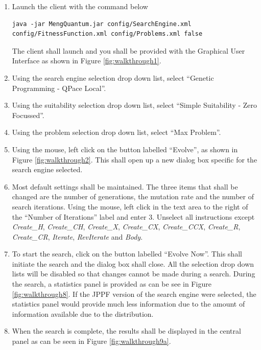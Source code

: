\begin{enumerate}
 \item Launch the client with the command below
\begin{lstlisting}
java -jar MengQuantum.jar config/SearchEngine.xml config/FitnessFunction.xml config/Problems.xml false
\end{lstlisting}
The client shall launch and you shall be provided with the Graphical User Interface as shown in Figure \ref{fig:walkthrough1}.

\item Using the search engine selection drop down list, select ``Genetic Programming - QPace Local''.

\item Using the suitability selection drop down list, select ``Simple Suitability - Zero Focussed''.

\item Using the problem selection drop down list, select ``Max Problem''.

\item Using the mouse, left click on the button labelled ``Evolve'', as shown in Figure \ref{fig:walkthrough2}.
This shall open up a new dialog box specific for the search engine selected.

\item \label{enum:searchsettings} Most default settings shall be maintained.
The three items that shall be changed are the number of generations, the mutation rate and the number of search iterations.
Using the mouse, left click in the text area to the right of the ``Number of Iterations'' label and enter $3$.
Unselect all instructions except \emph{Create\_H}, \emph{Create\_CH}, \emph{Create\_X}, \emph{Create\_CX}, \emph{Create\_CCX}, \emph{Create\_R}, \emph{Create\_CR}, \emph{Iterate}, \emph{RevIterate} and \emph{Body}.

\item To start the search, click on the button labelled ``Evolve Now''.
This shall initiate the search and the dialog box shall close.
All the selection drop down lists will be disabled so that changes cannot be made during a search.
During the search, a statistics panel is provided as can be see in Figure \ref{fig:walkthrough8}.
If the JPPF version of the search engine were selected,  the statistics panel would provide much less information due to the amount of information available due to the distribution.

\item When the search is complete, the results shall be displayed in the central panel as can be seen in Figure \ref{fig:walkthrough9a}.

\end{enumerate}

